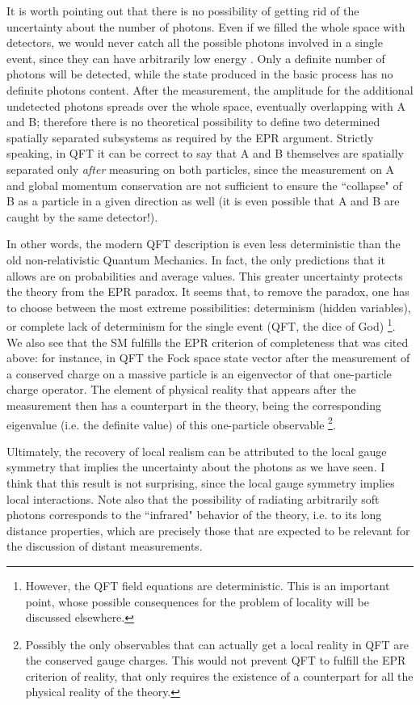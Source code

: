 \documentclass[aps,prl,showkeys,showpacs,preprint,groupedaddress,12pt]{revtex4}
\begin{document}
It is worth pointing out that there is no possibility of getting
rid of the uncertainty about the number of photons. Even if we
filled the whole space with detectors, we would never catch all
the possible photons involved in a single event, since they can
have arbitrarily low energy \cite{WeinbookI}. Only a definite
number of photons will be detected, while the state produced in
the basic process has no definite photons content. After the
measurement, the amplitude for the additional undetected photons
spreads over the whole space, eventually overlapping with A and B;
therefore there is no theoretical possibility to define two
determined spatially separated subsystems as required by the EPR
argument. Strictly speaking, in QFT it can be correct to say that
A and B themselves are spatially separated only {\it after}
measuring on both particles, since the measurement on A and global
momentum conservation are not sufficient to ensure the ``collapse"
of B as a particle in a given direction as well (it is even
possible that A and B are caught by the same detector!).

In other words, the modern QFT description is even less
deterministic than the old non-relativistic Quantum Mechanics. In
fact, the only predictions that it allows are on probabilities and
average values. This greater uncertainty protects the theory from
the EPR paradox. It seems that, to remove the paradox, one has to
choose between the most extreme possibilities: determinism (hidden
variables), or complete lack of determinism for the single event
(QFT, the dice of God) \footnote{However, the QFT field equations
are deterministic. This is an important point, whose possible
consequences for the problem of locality will be discussed
elsewhere.}. We also see that the SM fulfills the EPR criterion of
completeness that was cited above: for instance, in QFT the Fock
space state vector after the measurement of a conserved charge on
a massive particle is an eigenvector of that one-particle charge
operator. The element of physical reality that appears after the
measurement then has a counterpart in the theory, being the
corresponding eigenvalue (i.e. the definite value) of this
one-particle observable \footnote{Possibly the only observables
that can actually get a local reality in QFT are the conserved
gauge charges. This would not prevent QFT to fulfill the EPR
criterion of reality, that only requires the existence of a
counterpart for all the physical reality of the theory.}.

Ultimately, the recovery of local realism can be attributed to the
local gauge symmetry that implies the uncertainty about the
photons as we have seen. I think that this result is not
surprising, since the local gauge symmetry implies local
interactions. Note also that the possibility of radiating
arbitrarily soft photons corresponds to the ``infrared" behavior
of the theory, i.e. to its long distance properties, which are
precisely those that are expected to be relevant for the
discussion of distant measurements.
\end{document}

